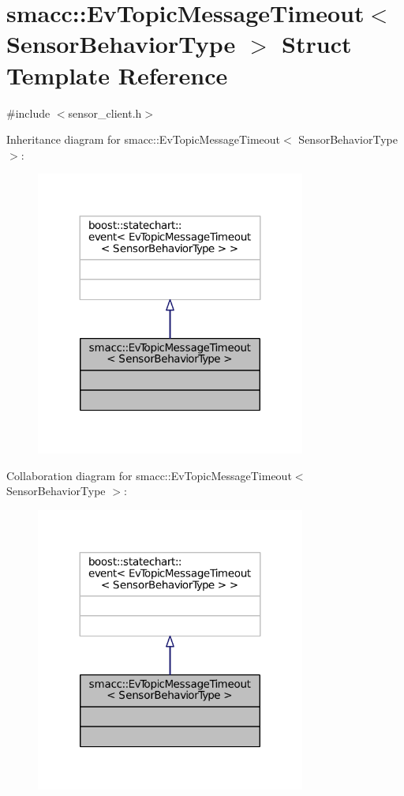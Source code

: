 \hypertarget{structsmacc_1_1EvTopicMessageTimeout}{}\section{smacc\+:\+:Ev\+Topic\+Message\+Timeout$<$ Sensor\+Behavior\+Type $>$ Struct Template Reference}
\label{structsmacc_1_1EvTopicMessageTimeout}


{\ttfamily \#include $<$sensor\+\_\+client.\+h$>$}



Inheritance diagram for smacc\+:\+:Ev\+Topic\+Message\+Timeout$<$ Sensor\+Behavior\+Type $>$\+:
\nopagebreak
\begin{figure}[H]
\begin{center}
\leavevmode
\includegraphics[width=251pt]{structsmacc_1_1EvTopicMessageTimeout__inherit__graph}
\end{center}
\end{figure}


Collaboration diagram for smacc\+:\+:Ev\+Topic\+Message\+Timeout$<$ Sensor\+Behavior\+Type $>$\+:
\nopagebreak
\begin{figure}[H]
\begin{center}
\leavevmode
\includegraphics[width=251pt]{structsmacc_1_1EvTopicMessageTimeout__coll__graph}
\end{center}
\end{figure}


